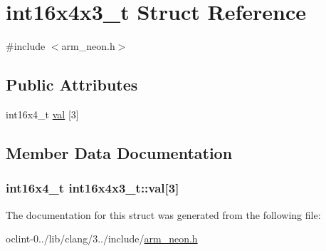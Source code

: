 \hypertarget{structint16x4x3__t}{\section{int16x4x3\-\_\-t Struct Reference}
\label{structint16x4x3__t}
}


{\ttfamily \#include $<$arm\-\_\-neon.\-h$>$}

\subsection*{Public Attributes}
\begin{DoxyCompactItemize}
\item 
int16x4\-\_\-t \hyperlink{structint16x4x3__t_ac08ece8a66fa793e79cd30252e1d86e4}{val} \mbox{[}3\mbox{]}
\end{DoxyCompactItemize}


\subsection{Member Data Documentation}
\hypertarget{structint16x4x3__t_ac08ece8a66fa793e79cd30252e1d86e4}{
\subsubsection[{val}]{\setlength{\rightskip}{0pt plus 5cm}int16x4\-\_\-t int16x4x3\-\_\-t\-::val\mbox{[}3\mbox{]}}}\label{structint16x4x3__t_ac08ece8a66fa793e79cd30252e1d86e4}


The documentation for this struct was generated from the following file\-:\begin{DoxyCompactItemize}
\item 
oclint-\/0../lib/clang/3../include/\hyperlink{arm__neon_8h}{arm\-\_\-neon.\-h}\end{DoxyCompactItemize}
